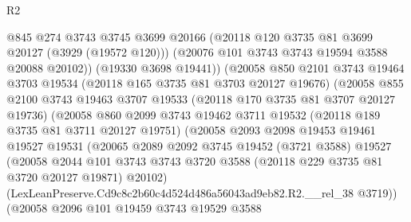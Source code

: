 \begin{lexlean}{R2}
\begin{coremodule}
                          @845
                          @274
                          @3743
                          @3745
                          @3699
                          @20166
                          (@20118 @120 @3735 @81 @3699 @20127 (@3929 (@19572 @120)))
                          (@20076 @101 @3743 @3743 @19594 @3588 @20088 @20102))
                        (@19330 @3698 @19441))
                      (@20058
                        @850
                        @2101
                        @3743
                        @19464
                        @3703
                        @19534
                        (@20118 @165 @3735 @81 @3703 @20127 @19676)
                        (@20058
                          @855
                          @2100
                          @3743
                          @19463
                          @3707
                          @19533
                          (@20118 @170 @3735 @81 @3707 @20127 @19736)
                          (@20058
                            @860
                            @2099
                            @3743
                            @19462
                            @3711
                            @19532
                            (@20118 @189 @3735 @81 @3711 @20127 @19751)
                            (@20058
                              @2093
                              @2098
                              @19453
                              @19461
                              @19527
                              @19531
                              (@20065
                                @2089
                                @2092
                                @3745
                                @19452
                                (@3721 @3588)
                                @19527
                                (@20058
                                  @2044
                                  @101
                                  @3743
                                  @3743
                                  @3720
                                  @3588
                                  (@20118 @229 @3735 @81 @3720 @20127 @19871)
                                  @20102)
                                (LexLeanPreserve.Cd9c8c2b60c4d524d486a56043ad9eb82.R2.__rel_38
                                  @3719))
                              (@20058
                                @2096
                                @101
                                @19459
                                @3743
                                @19529
                                @3588

\end{coremodule}
\end{lexlean}
